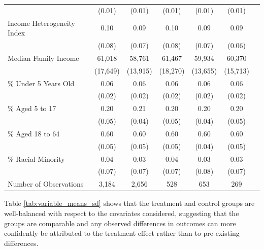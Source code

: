 \begin{longtable}{p{4cm}cccccc}
                    & (0.01) & (0.01) & (0.01) & (0.01) & (0.01) \\
    Income Heterogeneity Index & 0.10 & 0.09 & 0.10 & 0.09 & 0.09 \\[-2.3em]
                                & (0.08) & (0.07) & (0.08) & (0.07) & (0.06) \\
    Median Family Income & 61,018 & 58,761 & 61,467 & 59,934 & 60,370 \\[-2.3em]
                            & (17,649) & (13,915) & (18,270) & (13,655) & (15,713) \\
    \% Under 5 Years Old & 0.06 & 0.06 & 0.06 & 0.06 & 0.06 \\
                            & (0.02) & (0.02) & (0.02) & (0.02) & (0.02) \\
    \% Aged 5 to 17 & 0.20 & 0.21 & 0.20 & 0.20 & 0.20 \\
                    & (0.05) & (0.04) & (0.05) & (0.04) & (0.05) \\
    \% Aged 18 to 64 & 0.60 & 0.60 & 0.60 & 0.60 & 0.60 \\
                        & (0.05) & (0.05) & (0.05) & (0.04) & (0.05) \\
    \% Racial Minority & 0.04 & 0.03 & 0.04 & 0.03 & 0.03 \\
                        & (0.07) & (0.07) & (0.07) & (0.08) & (0.07) \\
    Number of Observations & 3,184 & 2,656 & 528 & 653 & 269 \\

\end{longtable}




Table \ref{tab:variable_means_sd} shows that the treatment and control groups are well-balanced with respect to the covariates considered, suggesting that the groups are comparable and any observed differences in outcomes can more confidently be attributed to the treatment effect rather than to pre-existing differences.

